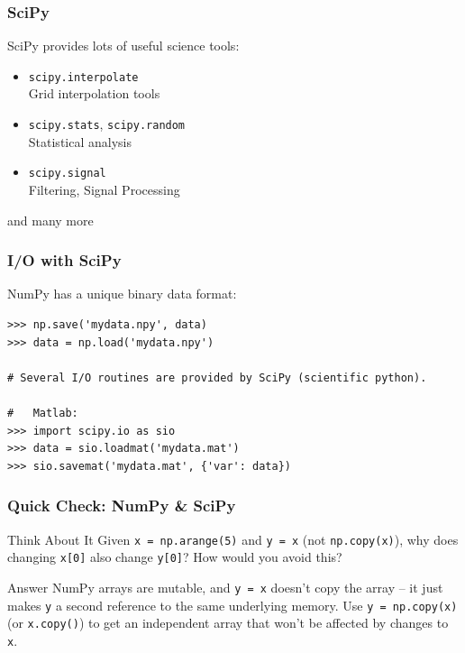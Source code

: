 \begin{frame}[fragile]
    \frametitle{SciPy}

    SciPy provides lots of useful science tools:
    \begin{itemize}
        \item \lstinline|scipy.interpolate|\\
            Grid interpolation tools
        \item \lstinline|scipy.stats|, \lstinline|scipy.random|\\
            Statistical analysis
        \item \lstinline|scipy.signal|\\
            Filtering, Signal Processing
    \end{itemize}
    and many more
\end{frame}

\begin{frame}[fragile]\frametitle{I/O with SciPy}
    
    NumPy has a unique binary data format:
    \begin{lstlisting}
>>> np.save('mydata.npy', data)
>>> data = np.load('mydata.npy')

# Several I/O routines are provided by SciPy (scientific python).

#   Matlab:
>>> import scipy.io as sio
>>> data = sio.loadmat('mydata.mat')
>>> sio.savemat('mydata.mat', {'var': data})
    \end{lstlisting}
\end{frame}

\begin{frame}[fragile]\frametitle{Quick Check: NumPy \& SciPy}
\begin{block}{Think About It}
Given \lstinline|x = np.arange(5)| and \lstinline|y = x| (not \lstinline|np.copy(x)|), why does
changing \lstinline|x[0]| also change \lstinline|y[0]|? How would you avoid this?
\end{block}
\pause
\begin{block}{Answer}
NumPy arrays are mutable, and \lstinline|y = x| doesn't copy the array -- it just makes
\texttt{y} a second reference to the same underlying memory. Use \lstinline|y = np.copy(x)| (or
\lstinline|x.copy()|) to get an independent array that won't be affected by changes to \texttt{x}.
\end{block}
\end{frame}

